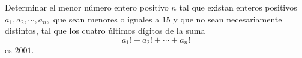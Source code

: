 Determinar el menor número entero positivo $ n$ tal que existan enteros positivos $ a_1,a_2,\cdots,a_n,$ que sean menores o iguales a $ 15$ y que no sean necesariamente distintos, tal que los cuatro últimos dígitos de la suma
\[ a_1! + a_2! + \cdots + a_n!\]
es $ 2001$.
